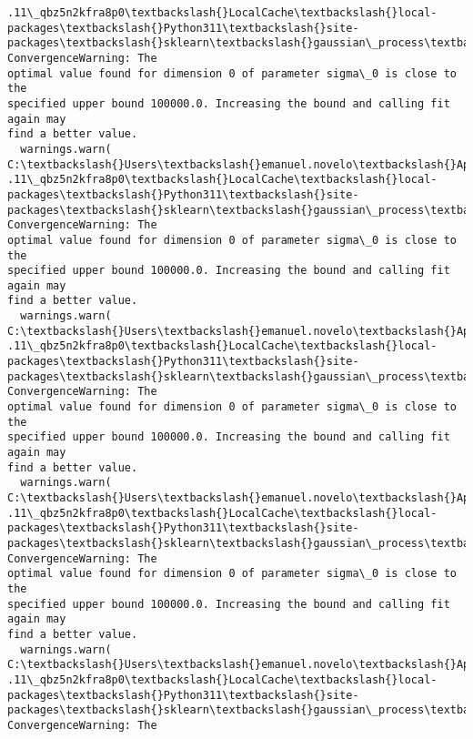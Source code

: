 \documentclass[11pt]{article}
\begin{document}
\begin{Verbatim}[commandchars=\\\{\}]
.11\_qbz5n2kfra8p0\textbackslash{}LocalCache\textbackslash{}local-packages\textbackslash{}Python311\textbackslash{}site-
packages\textbackslash{}sklearn\textbackslash{}gaussian\_process\textbackslash{}kernels.py:429: ConvergenceWarning: The
optimal value found for dimension 0 of parameter sigma\_0 is close to the
specified upper bound 100000.0. Increasing the bound and calling fit again may
find a better value.
  warnings.warn(
C:\textbackslash{}Users\textbackslash{}emanuel.novelo\textbackslash{}AppData\textbackslash{}Local\textbackslash{}Packages\textbackslash{}PythonSoftwareFoundation.Python.3
.11\_qbz5n2kfra8p0\textbackslash{}LocalCache\textbackslash{}local-packages\textbackslash{}Python311\textbackslash{}site-
packages\textbackslash{}sklearn\textbackslash{}gaussian\_process\textbackslash{}kernels.py:429: ConvergenceWarning: The
optimal value found for dimension 0 of parameter sigma\_0 is close to the
specified upper bound 100000.0. Increasing the bound and calling fit again may
find a better value.
  warnings.warn(
C:\textbackslash{}Users\textbackslash{}emanuel.novelo\textbackslash{}AppData\textbackslash{}Local\textbackslash{}Packages\textbackslash{}PythonSoftwareFoundation.Python.3
.11\_qbz5n2kfra8p0\textbackslash{}LocalCache\textbackslash{}local-packages\textbackslash{}Python311\textbackslash{}site-
packages\textbackslash{}sklearn\textbackslash{}gaussian\_process\textbackslash{}kernels.py:429: ConvergenceWarning: The
optimal value found for dimension 0 of parameter sigma\_0 is close to the
specified upper bound 100000.0. Increasing the bound and calling fit again may
find a better value.
  warnings.warn(
C:\textbackslash{}Users\textbackslash{}emanuel.novelo\textbackslash{}AppData\textbackslash{}Local\textbackslash{}Packages\textbackslash{}PythonSoftwareFoundation.Python.3
.11\_qbz5n2kfra8p0\textbackslash{}LocalCache\textbackslash{}local-packages\textbackslash{}Python311\textbackslash{}site-
packages\textbackslash{}sklearn\textbackslash{}gaussian\_process\textbackslash{}kernels.py:429: ConvergenceWarning: The
optimal value found for dimension 0 of parameter sigma\_0 is close to the
specified upper bound 100000.0. Increasing the bound and calling fit again may
find a better value.
  warnings.warn(
C:\textbackslash{}Users\textbackslash{}emanuel.novelo\textbackslash{}AppData\textbackslash{}Local\textbackslash{}Packages\textbackslash{}PythonSoftwareFoundation.Python.3
.11\_qbz5n2kfra8p0\textbackslash{}LocalCache\textbackslash{}local-packages\textbackslash{}Python311\textbackslash{}site-
packages\textbackslash{}sklearn\textbackslash{}gaussian\_process\textbackslash{}kernels.py:429: ConvergenceWarning: The

\end{Verbatim}
\end{document}
